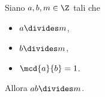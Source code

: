 \begin{lemma}
    Siano $a, b, m \in \Z$ tali che \begin{itemize}
        \item $a \divides m$,
        \item $b \divides m$,
        \item $\mcd{a}{b} = 1$.
    \end{itemize}
    Allora $ab \divides m$.
\end{lemma}